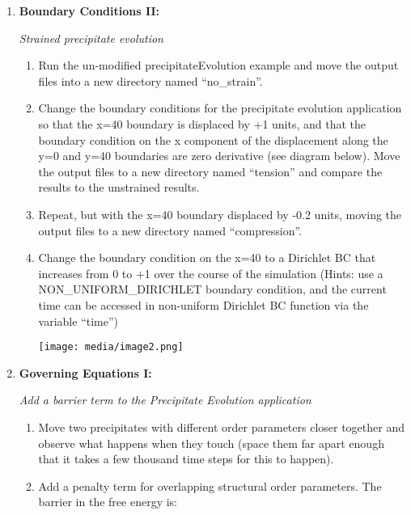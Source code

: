 \documentclass[]{article}
\begin{document}
\begin{enumerate}
\def\labelenumi{\arabic{enumi}.}
\item
  \textbf{Boundary Conditions II: }

  \emph{Strained precipitate evolution}

  \begin{enumerate}
  \def\labelenumii{\alph{enumii}.}
  \item
    Run the un-modified precipitateEvolution example and move the output
    files into a new directory named ``no\_strain''.
  \item
    Change the boundary conditions for the precipitate evolution
    application so that the x=40 boundary is displaced by +1 units, and
    that the boundary condition on the x component of the displacement
    along the y=0 and y=40 boundaries are zero derivative (see diagram
    below). Move the output files to a new directory named ``tension''
    and compare the results to the unstrained results.
  \item
    Repeat, but with the x=40 boundary displaced by -0.2 units, moving
    the output files to a new directory named ``compression''.
  \item
    Change the boundary condition on the x=40 to a Dirichlet BC that
    increases from 0 to +1 over the course of the simulation (Hints: use
    a NON\_UNIFORM\_DIRICHLET boundary condition, and the current time
    can be accessed in non-uniform Dirichlet BC function via the
    variable ``time'')

    \texttt{[image: media/image2.png]}
  \end{enumerate}
\item
  \textbf{Governing Equations I: }

  \emph{Add a barrier term to the Precipitate Evolution application}

  \begin{enumerate}
  \def\labelenumii{\alph{enumii}.}
  \item
    Move two precipitates with different order parameters closer
    together and observe what happens when they touch (space them far
    apart enough that it takes a few thousand time steps for this to
    happen).
  \item
    Add a penalty term for overlapping structural order parameters. The
    barrier in the free energy is:
  \end{enumerate}
\end{enumerate}
\end{document}
